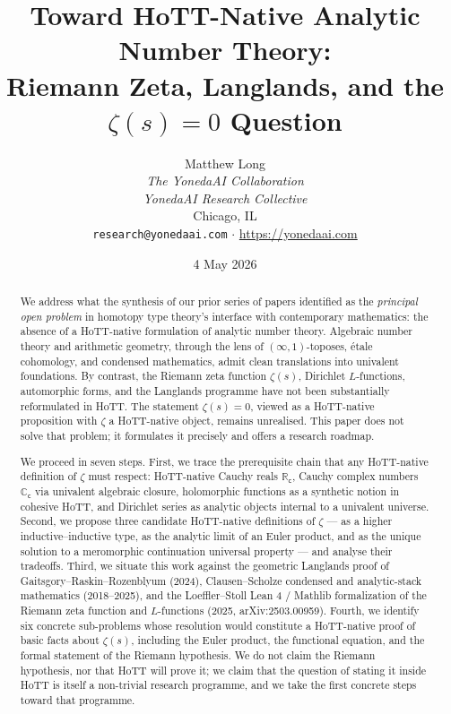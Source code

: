 \documentclass[12pt]{article}
\title{Toward HoTT-Native Analytic Number Theory:\\
Riemann Zeta, Langlands, and the $\zeta(s)=0$ Question}
\author{Matthew Long \\
\textit{The YonedaAI Collaboration} \\
\textit{YonedaAI Research Collective} \\
Chicago, IL \\
\texttt{research@yonedaai.com} $\cdot$ \url{https://yonedaai.com}}
\date{4 May 2026}
\theoremstyle{definition}
\theoremstyle{remark}
\newcommand{\C}{\mathbb{C}}
\newcommand{\R}{\mathbb{R}}
\newcommand{\Cc}{\C_{\mathsf{c}}}
\newcommand{\Rc}{\R_{\mathsf{c}}}
\begin{document}
\maketitle

\begin{abstract}
We address what the synthesis of our prior series of papers identified as the
\emph{principal open problem} in homotopy type theory's interface with
contemporary mathematics: the absence of a HoTT-native formulation of analytic
number theory. Algebraic number theory and arithmetic geometry, through the
lens of $(\infty,1)$-toposes, étale cohomology, and condensed mathematics,
admit clean translations into univalent foundations. By contrast, the Riemann
zeta function $\zeta(s)$, Dirichlet $L$-functions, automorphic forms, and the
Langlands programme have not been substantially reformulated in HoTT. The
statement $\zeta(s)=0$, viewed as a HoTT-native proposition with $\zeta$ a
HoTT-native object, remains unrealised. This paper does not solve that problem;
it formulates it precisely and offers a research roadmap.

We proceed in seven steps. First, we trace the prerequisite chain that any
HoTT-native definition of $\zeta$ must respect: HoTT-native Cauchy reals
$\Rc$, Cauchy complex numbers $\Cc$ via univalent algebraic closure,
holomorphic functions as a synthetic notion in cohesive HoTT, and Dirichlet
series as analytic objects internal to a univalent universe. Second, we
propose three candidate HoTT-native definitions of $\zeta$ — as a higher
inductive--inductive type, as the analytic limit of an Euler product, and as
the unique solution to a meromorphic continuation universal property — and
analyse their tradeoffs. Third, we situate this work against the geometric
Langlands proof of Gaitsgory--Raskin--Rozenblyum (2024), Clausen--Scholze
condensed and analytic-stack mathematics (2018--2025), and the
Loeffler--Stoll Lean 4 / Mathlib formalization of the Riemann zeta function
and $L$-functions (2025, arXiv:2503.00959). Fourth, we identify six concrete
sub-problems whose resolution would constitute a HoTT-native proof of
basic facts about $\zeta(s)$, including the Euler product, the functional
equation, and the formal statement of the Riemann hypothesis. We do not claim
the Riemann hypothesis, nor that HoTT will prove it; we claim that the
question of stating it inside HoTT is itself a non-trivial research programme,
and we take the first concrete steps toward that programme.
\end{abstract}
\end{document}
